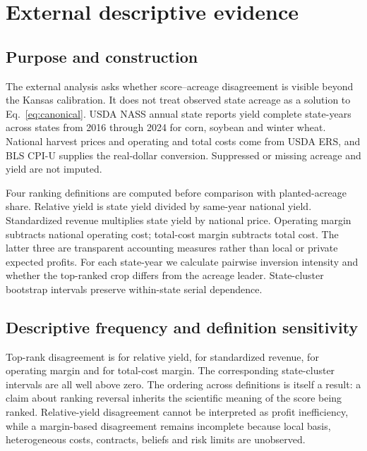 \section{External descriptive evidence}

\subsection{Purpose and construction}

The external analysis asks whether score--acreage disagreement is visible
beyond the Kansas calibration. It does not treat observed state acreage as a
solution to Eq.~\ref{eq:canonical}. USDA NASS annual state reports yield
\StateYears{} complete state-years across \States{} states from 2016 through
2024 for corn, soybean and winter wheat. National harvest prices and operating
and total costs come from USDA ERS, and BLS CPI-U supplies the real-dollar
conversion. Suppressed or missing acreage and yield are not imputed.

Four ranking definitions are computed before comparison with planted-acreage
share. Relative yield is state yield divided by same-year national yield.
Standardized revenue multiplies state yield by national price. Operating
margin subtracts national operating cost; total-cost margin subtracts total
cost. The latter three are transparent accounting measures rather than local
or private expected profits. For each state-year we calculate pairwise
inversion intensity and whether the top-ranked crop differs from the acreage
leader. State-cluster bootstrap intervals preserve within-state serial
dependence.

\subsection{Descriptive frequency and definition sensitivity}

Top-rank disagreement is \RelativeYieldRate{} for relative yield,
\RevenueRate{} for standardized revenue, \OperatingMarginRate{} for operating
margin and \TotalCostRate{} for total-cost margin. The corresponding
state-cluster intervals are all well above zero. The ordering across
definitions is itself a result: a claim about ranking reversal inherits the
scientific meaning of the score being ranked. Relative-yield disagreement
cannot be interpreted as profit inefficiency, while a margin-based
disagreement remains incomplete because local basis, heterogeneous costs,
contracts, beliefs and risk limits are unobserved.

